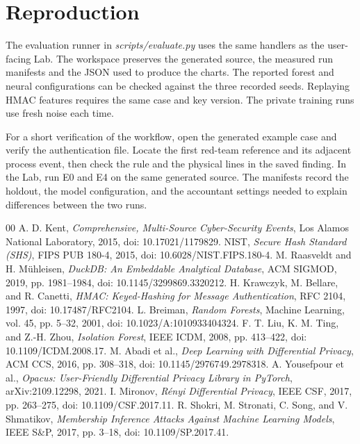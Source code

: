\documentclass[conference]{IEEEtran}
\begin{document}
\newpage
\section{Reproduction}
The evaluation runner in \textit{scripts/evaluate.py} uses the same handlers as the user-facing Lab. The workspace preserves the generated source, the measured run manifests and the JSON used to produce the charts. The reported forest and neural configurations can be checked against the three recorded seeds. Replaying HMAC features requires the same case and key version. The private training runs use fresh noise each time.

For a short verification of the workflow, open the generated example case and verify the authentication file. Locate the first red-team reference and its adjacent process event, then check the rule and the physical lines in the saved finding. In the Lab, run E0 and E4 on the same generated source. The manifests record the holdout, the model configuration, and the accountant settings needed to explain differences between the two runs.

\begin{thebibliography}{00}
 A. D. Kent, \emph{Comprehensive, Multi-Source Cyber-Security Events}, Los Alamos National Laboratory, 2015, doi: 10.17021/1179829.
 NIST, \emph{Secure Hash Standard (SHS)}, FIPS PUB 180-4, 2015, doi: 10.6028/NIST.FIPS.180-4.
 M. Raasveldt and H. M\"uhleisen, \emph{DuckDB: An Embeddable Analytical Database}, ACM SIGMOD, 2019, pp. 1981--1984, doi: 10.1145/3299869.3320212.
 H. Krawczyk, M. Bellare, and R. Canetti, \emph{HMAC: Keyed-Hashing for Message Authentication}, RFC 2104, 1997, doi: 10.17487/RFC2104.
 L. Breiman, \emph{Random Forests}, Machine Learning, vol. 45, pp. 5--32, 2001, doi: 10.1023/A:1010933404324.
 F. T. Liu, K. M. Ting, and Z.-H. Zhou, \emph{Isolation Forest}, IEEE ICDM, 2008, pp. 413--422, doi: 10.1109/ICDM.2008.17.
 M. Abadi et al., \emph{Deep Learning with Differential Privacy}, ACM CCS, 2016, pp. 308--318, doi: 10.1145/2976749.2978318.
 A. Yousefpour et al., \emph{Opacus: User-Friendly Differential Privacy Library in PyTorch}, arXiv:2109.12298, 2021.
 I. Mironov, \emph{R\'enyi Differential Privacy}, IEEE CSF, 2017, pp. 263--275, doi: 10.1109/CSF.2017.11.
 R. Shokri, M. Stronati, C. Song, and V. Shmatikov, \emph{Membership Inference Attacks Against Machine Learning Models}, IEEE S\&P, 2017, pp. 3--18, doi: 10.1109/SP.2017.41.
\end{thebibliography}
\end{document}
